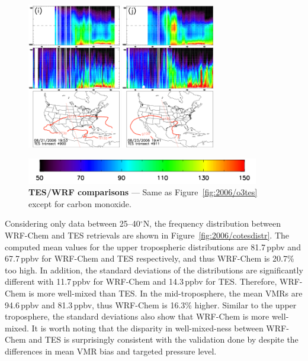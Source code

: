 \begin{figure}
\begin{center}
		\includegraphics[width=1.6in]{co/co_4900_ftuv}
		\includegraphics[width=1.6in]{co/co_4911_ftuv}
		
		\includegraphics[width=4in]{co/co_colorbar}
		\end{center}
	    	\caption[TES/WRF-Chem  comparisons]{\textbf{TES/WRF  comparisons} --- Same as Figure~\ref{fig:2006/o3tes} except for carbon
		monoxide.} \label{fig:2006/cotes}
	\end{figure}

Considering only data between 25--40$^\circ$N, the frequency distribution between WRF-Chem and TES retrievals are shown in Figure~\ref{fig:2006/cotesdistr}. The
computed mean values for the upper tropospheric distributions are 81.7\,\unit{ppbv} and 67.7\,\unit{ppbv} for WRF-Chem and TES respectively, and thus WRF-Chem is
20.7\% too high. In addition, the standard deviations of the distributions are significantly different with 11.7\,\unit{ppbv} for WRF-Chem and 14.3\,\unit{ppbv} for TES. Therefore,
WRF-Chem is more well-mixed than TES. In the mid-troposphere, the mean VMRs are 94.6\,\unit{ppbv} and 81.3\,\unit{ppbv}, thus WRF-Chem is 16.3\% higher. Similar
to the upper troposphere, the standard deviations also show that WRF-Chem is more well-mixed. It is worth noting that the disparity in  well-mixed-ness between
WRF-Chem and TES is surprisingly consistent with the validation done by \citep{Barth:2012qf} despite the differences in mean VMR bias and targeted pressure level.

